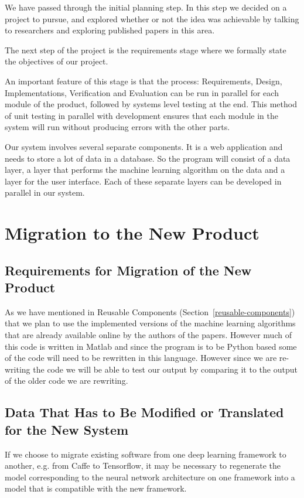 \documentclass{scrreprt}
\begin{document}
{We have passed through the initial planning step. In this step we decided on
a project to pursue, and explored whether or not the idea was achievable by
talking to researchers and exploring published papers in this area.}

{The next step of the project is the requirements stage where we formally state
the objectives of our project.}

{An important feature of this stage is that the process: Requirements, Design,
Implementations, Verification and Evaluation can be run in parallel for each
module of the product, followed by systems level testing at the end. This
method of unit testing in parallel with development ensures that each module in
the system will run without producing errors with the other parts.}

{Our system involves several separate components. It is a web
application and needs to store a lot of data in a database. So the
program will consist of a data layer, a layer that performs the machine
learning algorithm on the data and a layer for the user interface. Each
of these separate layers can be developed in parallel in our system.}

\section{Migration to the New Product}

\subsection{Requirements for Migration of the New Product}

{As we have mentioned in Reusable Components
(Section~\ref{reusable-components}) that we plan to use the implemented
versions of the machine learning algorithms that are already available online
by the authors of the papers. However much of this code is written in Matlab
and since the program is to be Python based some of the code will need to be
rewritten in this language. However since we are re-writing the code we will be
able to test our output by comparing it to the output of the older code we are
rewriting.}

\subsection{Data That Has to Be Modified or Translated for the New
            System}

If we choose to migrate existing software from one deep learning framework to
another, e.g. from Caffe to Tensorflow, it may be necessary to regenerate the
model corresponding to the neural network architecture on one framework into a
model that is compatible with the new framework.
\end{document}
